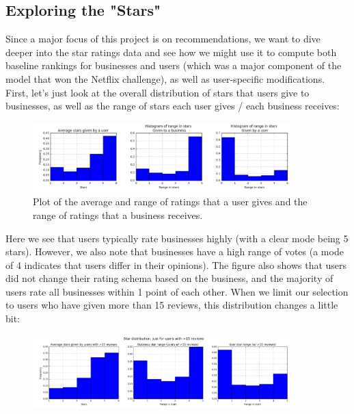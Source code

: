 \documentclass[11pt]{article}
\begin{document}
\subsection*{Exploring the "Stars"}

Since a major focus of this project is on recommendations, we want to dive deeper into the star ratings data and see how we might use it to compute both baseline rankings for businesses and users (which was a major component of the model that won the Netflix challenge), as well as user-specific modifications. First, let's just look at the overall distribution of stars that users give to businesses, as well as the range of stars each user gives / each business receives:

\begin{figure}[H]
\centering
\includegraphics[width=0.9\textwidth]{./ac209/star-ranges-labeled.png}
\caption{Plot of the average and range of ratings that a user gives and the range of ratings that a business receives.}
\end{figure}

Here we see that users typically rate businesses highly (with a clear mode being 5 stars). However, we also note that businesses have a high range of votes (a mode of 4 indicates that users differ in their opinions). The figure also shows that users did not change their rating schema based on the business, and the majority of users rate all businesses within 1 point of each other. When we limit our selection to users who have given more than 15 reviews, this distribution changes a little bit:

\begin{figure}[H]
\centering
\includegraphics[width=0.9\textwidth]{./ac209/star-ranges-more-than-15-reviews.png}
\caption{}
\end{figure}
\end{document}
